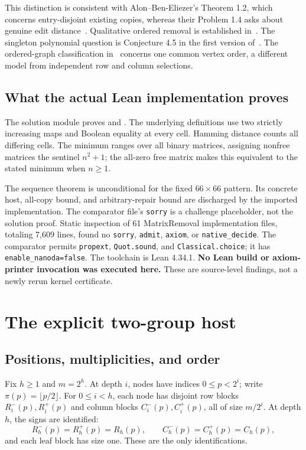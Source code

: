 \documentclass[11pt,a4paper]{article}
\theoremstyle{remark}
\begin{document}
This distinction is consistent with Alon--Ben-Eliezer's Theorem 1.2,
which concerns entry-disjoint existing copies, whereas their Problem 1.4
asks about genuine edit distance~\cite{ab}. Qualitative ordered removal
is established in~\cite{abf}. The singleton polynomial question is
Conjecture 4.5 in the first version of~\cite{gs}. The ordered-graph
classification in~\cite{gt} concerns one common vertex order, a different
model from independent row and column selections.

\subsection{What the actual Lean implementation proves}
The solution module
 proves
 and
.
The underlying definitions use two strictly increasing maps and Boolean
equality at every cell. Hamming distance counts all differing cells.
The minimum ranges over all binary matrices, assigning nonfree matrices
the sentinel \(n^2+1\); the all-zero free matrix makes this equivalent
to the stated minimum when \(n\ge1\).

The sequence theorem is unconditional for the fixed \(66\times66\)
pattern. Its concrete host, all-copy bound, and arbitrary-repair bound
are discharged by the imported implementation. The comparator file's
\texttt{sorry} is a challenge placeholder, not the solution proof.
Static inspection of 61 MatrixRemoval implementation files, totaling
7,609 lines, found no \texttt{sorry}, \texttt{admit}, \texttt{axiom}, or
\texttt{native\_decide}. The comparator permits
\texttt{propext}, \texttt{Quot.sound}, and \texttt{Classical.choice};
it has \texttt{enable\_nanoda=false}. The toolchain is Lean 4.34.1.
\textbf{No Lean build or axiom-printer invocation was executed here.}
These are source-level findings, not a newly rerun kernel certificate.

\section{The explicit two-group host}\label{sec:host}

\subsection{Positions, multiplicities, and order}
Fix \(h\ge1\) and \(m=2^h\). At depth \(i\), nodes have indices
\(0\le p<2^i\); write \(\pi(p)=\lfloor p/2\rfloor\).
For \(0\le i<h\), each node has disjoint row blocks
\(R_i^-(p),R_i^+(p)\) and column blocks \(C_i^-(p),C_i^+(p)\),
all of size \(m/2^i\). At depth \(h\), the signs are identified:
\[
R_h^-(p)=R_h^+(p)=R_h(p),\qquad
C_h^-(p)=C_h^+(p)=C_h(p),
\]
and each leaf block has size one. These are the only identifications.
\end{document}
